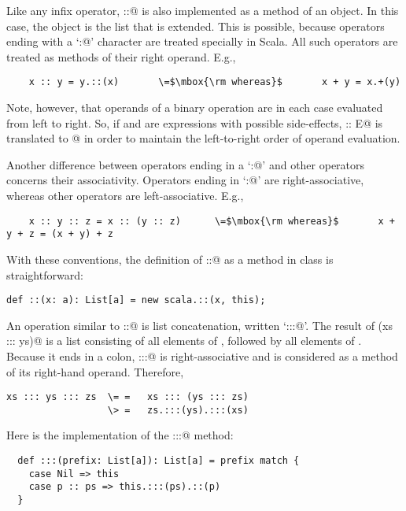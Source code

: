 \documentclass[11pt]{book}
\begin{document}
Like any infix operator, \verb@::@
is also implemented as a method of an object. In this case, the object
is the list that is extended. This is possible, because operators
ending with a `\verb@:@' character are treated specially in Scala.  
All such operators are treated as methods of their right operand. E.g.,
\begin{verbatim}
    x :: y = y.::(x)       \=$\mbox{\rm whereas}$       x + y = x.+(y)                  
\end{verbatim}
Note, however, that operands of a binary operation are in each case
evaluated from left to right.  So, if \verb@D@ and \verb@E@ are
expressions with possible side-effects, \verb@D :: E@ is translated to
@ in order to maintain the left-to-right
order of operand evaluation.

Another difference between operators ending in a `\verb@:@' and other
operators concerns their associativity.  Operators ending in
`\verb@:@' are right-associative, whereas other operators are
left-associative.  E.g.,
\begin{verbatim}
    x :: y :: z = x :: (y :: z)      \=$\mbox{\rm whereas}$       x + y + z = (x + y) + z
\end{verbatim}
With these conventions, the definition of \verb@::@ as a method in
class \verb@List@ is straightforward:
\begin{verbatim}
def ::(x: a): List[a] = new scala.::(x, this);
\end{verbatim}
An operation similar to \verb@::@ is list concatenation, written
`\verb@:::@'. The result of \verb@(xs ::: ys)@ is a list consisting of
all elements of \verb@xs@, followed by all elements of \verb@ys@.
Because it ends in a colon, \verb@:::@ is right-associative and is
considered as a method of its right-hand operand. Therefore,
\begin{verbatim}
xs ::: ys ::: zs  \= =   xs ::: (ys ::: zs)
                  \> =   zs.:::(ys).:::(xs)
\end{verbatim}
Here is the implementation of the \verb@:::@ method:
\begin{verbatim}
  def :::(prefix: List[a]): List[a] = prefix match {
    case Nil => this
    case p :: ps => this.:::(ps).::(p)
  }
\end{verbatim}
\end{document}
